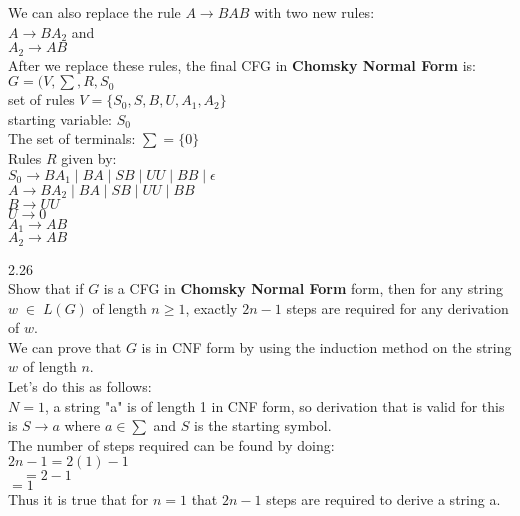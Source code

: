 \documentclass[12pt]{article}
\begin{document}
We can also replace the rule $A \rightarrow BAB$ with two new rules: \\
$A \rightarrow BA_2$ and \\
$A_2 \rightarrow AB$ \\

After we replace these rules, the final CFG in \textbf{Chomsky Normal Form} is: \\
$G = (V, \sum, R, S_0$ \\
set of rules $V = \{S_0, S, B, U, A_1, A_2 \}$ \\
starting variable: $S_0$ \\
The set of terminals: $\sum = \{ 0 \}$ \\
Rules $R$ given by: \\
$S_0 \rightarrow BA_1 \; | \; BA \; | \; SB \; | \; UU \; | \; BB \; | \; \epsilon$ \\
$A \rightarrow BA_2 \; | \; BA \; | \; SB \; | \; UU \; | \; BB $ \\
$B \rightarrow UU $ \\
$U \rightarrow 0$ \\
$A_1 \rightarrow AB$ \\
$A_2 \rightarrow AB$ \\

\pagebreak

2.26 \\
Show that if $G$ is a CFG in \textbf{Chomsky Normal Form} form, then for any string $w \; \in \; L(G)$
of length $n \geq 1$, exactly $2n - 1$ steps are required for any derivation of $w$. \\

We can prove that $G$ is in CNF form by using the induction method on the string $w$ of length $n$. \\

Let's do this as follows: \\
$N = 1$, a string "a" is of length 1 in CNF form, so derivation that is valid for this is
$S \rightarrow a$ where $a \in \sum$ and $S$ is the starting symbol. \\

The number of steps required can be found by doing: \\
$2n - 1 = 2(1) - 1$ \\
$ \quad = 2 - 1 $ \\
$       = 1 $ \\
Thus it is true that for $n = 1$ that $2n - 1$ steps are required to derive a string a. \\
\end{document}

